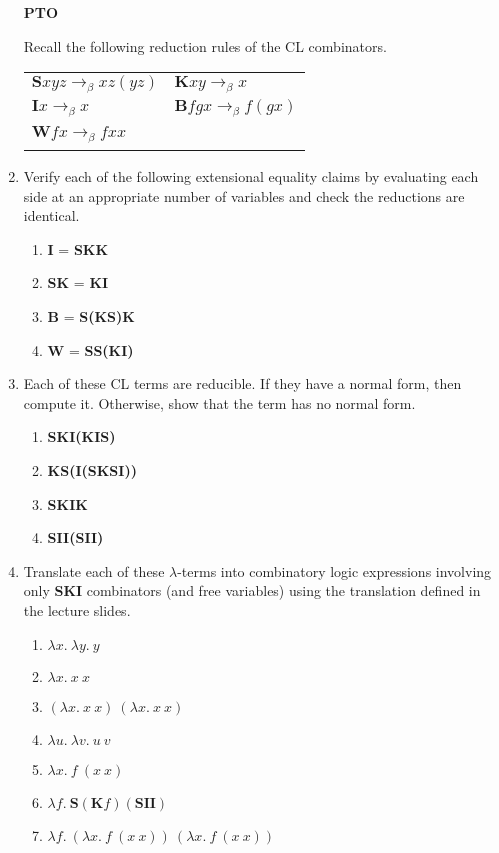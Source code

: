 \documentclass[11pt]{report}
\begin{document}
\begin{enumerate}
	 \vfill
	 \hfill \textbf{PTO}



\newpage

Recall the following reduction rules of the CL combinators. 

\begin{tabular}{l l}
$\textbf{S}xyz \to_{\beta} xz(yz)$ & $\textbf{K}xy \to_{\beta} x$ \\
$\textbf{I}x \to_{\beta} x$ & $\textbf{B}fgx \to_{\beta}f(gx)$ \\
$\textbf{W}fx \to_{\beta}fxx$ & \
\end{tabular}

\item Verify each of the following extensional equality claims by evaluating each side at an appropriate number of variables and check the reductions are identical.

	\begin{enumerate}
		\item \textbf{I} = \textbf{SKK}
		\item \textbf{SK} = \textbf{KI}
		\item \textbf{B} = \textbf{S(KS)K}
		\item \textbf{W} = \textbf{SS(KI)}
	\end{enumerate}

\item Each of these CL terms are reducible. If they have a normal form, then compute it. Otherwise, show that the term has no normal form.

	\begin{enumerate}
		\item \textbf{SKI(KIS)}
		\item \textbf{KS(I(SKSI))}
		\item \textbf{SKIK}	
		\item \textbf{SII(SII)}
	\end{enumerate}

\item Translate each of these $\lambda$-terms into combinatory logic expressions involving only \textbf{SKI} combinators (and free variables) using the translation defined in the lecture slides.

	\begin{enumerate}
		\item $\lambda x. \ \lambda y. \ y$
		\item $\lambda x. \ x \ x$
		\item $(\lambda x. \ x \ x) \ (\lambda x. \ x \ x)$
		\item $\lambda u . \ \lambda v. \ u \ v$
		\item $\lambda x. \ f \ (x \ x)$
		\item $\lambda f. \ \textbf{S}(\textbf{K}f)(\textbf{SII})$
		\item $\lambda f. \ (\lambda x. \ f \ (x \ x)) \ (\lambda x. \ f \ (x \ x))$ 	
	\end{enumerate}

	

	 
\end{enumerate}
	
\end{document}
